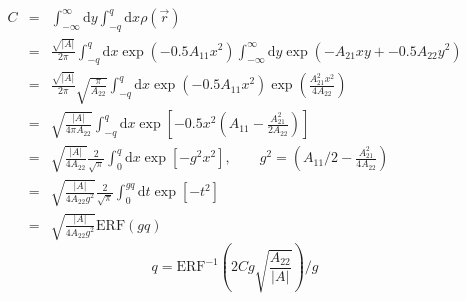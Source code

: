 \documentclass[12pt]{article}
\newcommand{\dee}{\mathrm{d}}
\newcommand{\abs}[1]{\left|#1\right|}
\begin{document}
\begin{eqnarray*}
  C 
  &=& \int_{-\infty}^{\infty}\dee y\int_{-q}^q \dee x \rho(\vec{r})\\
  &=& \frac{\sqrt{\abs{A}}}{2\pi} \int_{-q}^q \dee x \exp\left(-0.5 A_{11}x^2\right) \int_{-\infty}^{\infty}\dee y \exp\left(-A_{21}xy + -0.5A_{22}y^2 \right)\\
  &=& \frac{\sqrt{\abs{A}}}{2\pi} \sqrt{\frac{\pi}{A_{22}}}\int_{-q}^q \dee x \exp\left(-0.5 A_{11}x^2\right) \exp\left(\frac{A_{21}^2x^2}{4A_{22}}\right)\\
  &=& \sqrt{\frac{\abs{A}}{4\pi A_{22}}}\int_{-q}^q \dee x \exp\left[-0.5 x^2\left( A_{11} - \frac{A_{21}^2}{2A_{22}}\right)\right]\\
  &=& \sqrt{\frac{\abs{A}}{4 A_{22}}}\frac{2}{\sqrt{\pi}}\int_0^q \dee x \exp\left[- g^2x^2\right],\qquad g^2=\left( A_{11}/2 - \frac{A_{21}^2}{4A_{22}}\right)\\
  &=& \sqrt{\frac{\abs{A}}{4 A_{22}g^2}}\frac{2}{\sqrt{\pi}}\int_0^{gq} \dee t \exp\left[- t^2\right]\\
  &=& \sqrt{\frac{\abs{A}}{4 A_{22}g^2}} \mathrm{ERF}(gq)
\end{eqnarray*}
\begin{equation}
  q = \mathrm{ERF}^{-1}\left(2Cg\sqrt{\frac{A_{22}}{\abs{A}}}\right)/g
\end{equation}
\end{document}
